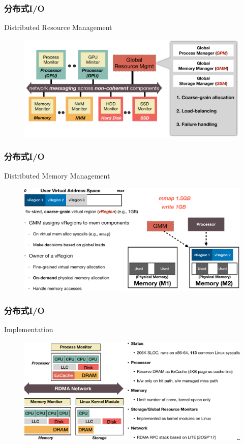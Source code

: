 \begin{frame}[fragile]
    \frametitle{分布式I/O}
    Distributed Resource Management
    
    \begin{figure}
        \includegraphics[width=0.9\linewidth]{figs/disio-resource.png}
    \end{figure}
\end{frame}

\begin{frame}[fragile]
    \frametitle{分布式I/O}
    Distributed Memory Management
    \begin{figure}
        \includegraphics[width=0.9\linewidth]{figs/disio-dmm.png}
    \end{figure}
\end{frame}


\begin{frame}[fragile]
    \frametitle{分布式I/O}
    Implementation
    \begin{figure}
        \includegraphics[width=0.9\linewidth]{figs/disio-impl.png}
    \end{figure}
\end{frame}

